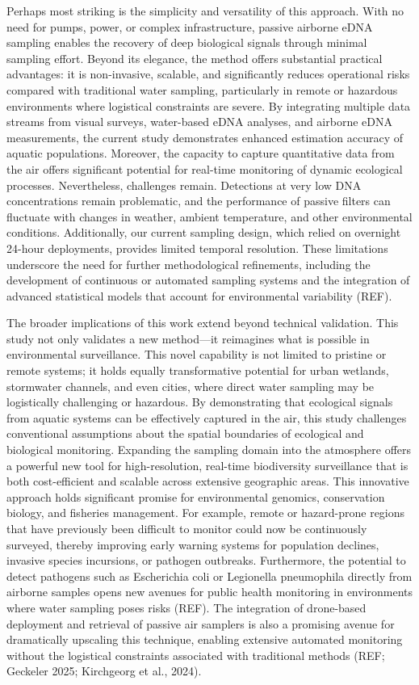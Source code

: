 \documentclass{article}
\begin{document}
Perhaps most striking is the simplicity and versatility of this approach. With no need for pumps, power, or complex infrastructure, passive airborne eDNA sampling enables the recovery of deep biological signals through minimal sampling effort. Beyond its elegance, the method offers substantial practical advantages: it is non-invasive, scalable, and significantly reduces operational risks compared with traditional water sampling, particularly in remote or hazardous environments where logistical constraints are severe. By integrating multiple data streams from visual surveys, water-based eDNA analyses, and airborne eDNA measurements, the current study demonstrates enhanced estimation accuracy of aquatic populations. Moreover, the capacity to capture quantitative data from the air offers significant potential for real-time monitoring of dynamic ecological processes. Nevertheless, challenges remain. Detections at very low DNA concentrations remain problematic, and the performance of passive filters can fluctuate with changes in weather, ambient temperature, and other environmental conditions. Additionally, our current sampling design, which relied on overnight 24-hour deployments, provides limited temporal resolution. These limitations underscore the need for further methodological refinements, including the development of continuous or automated sampling systems and the integration of advanced statistical models that account for environmental variability (REF).

The broader implications of this work extend beyond technical validation. This study not only validates a new method—it reimagines what is possible in environmental surveillance. This novel capability is not limited to pristine or remote systems; it holds equally transformative potential for urban wetlands, stormwater channels, and even cities, where direct water sampling may be logistically challenging or hazardous. By demonstrating that ecological signals from aquatic systems can be effectively captured in the air, this study challenges conventional assumptions about the spatial boundaries of ecological and biological monitoring. Expanding the sampling domain into the atmosphere offers a powerful new tool for high-resolution, real-time biodiversity surveillance that is both cost-efficient and scalable across extensive geographic areas. This innovative approach holds significant promise for environmental genomics, conservation biology, and fisheries management. For example, remote or hazard-prone regions that have previously been difficult to monitor could now be continuously surveyed, thereby improving early warning systems for population declines, invasive species incursions, or pathogen outbreaks. Furthermore, the potential to detect pathogens such as Escherichia coli or Legionella pneumophila directly from airborne samples opens new avenues for public health monitoring in environments where water sampling poses risks (REF). The integration of drone-based deployment and retrieval of passive air samplers is also a promising avenue for dramatically upscaling this technique, enabling extensive automated monitoring without the logistical constraints associated with traditional methods (REF; Geckeler 2025; Kirchgeorg et al., 2024).
\end{document}
